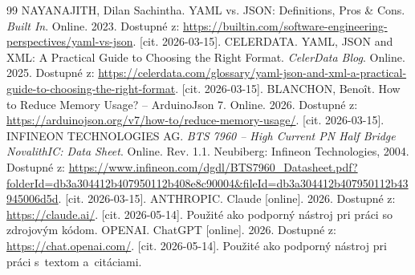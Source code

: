 \begin{thebibliography}{99}
    NAYANAJITH, Dilan Sachintha.
    YAML vs. JSON: Definitions, Pros \& Cons.
    \textit{Built In}. Online. 2023.
    Dostupné z: \url{https://builtin.com/software-engineering-perspectives/yaml-vs-json}. [cit. 2026-03-15].
    CELERDATA.
    YAML, JSON and XML: A Practical Guide to Choosing
    the Right Format.
    \textit{CelerData Blog}. Online. 2025.
    Dostupné z: \url{https://celerdata.com/glossary/yaml-json-and-xml-a-practical-guide-to-choosing-the-right-format}. [cit. 2026-03-15].
    BLANCHON, Benoît.
    How to Reduce Memory Usage? -- ArduinoJson 7. Online.
    2026.
    Dostupné z: \url{https://arduinojson.org/v7/how-to/reduce-memory-usage/}. [cit. 2026-03-15].
    INFINEON TECHNOLOGIES AG.
    \textit{BTS 7960 -- High Current PN Half Bridge NovalithIC:
    Data Sheet}. Online.
    Rev. 1.1. Neubiberg: Infineon Technologies, 2004.
    Dostupné z: \url{https://www.infineon.com/dgdl/BTS7960_Datasheet.pdf?folderId=db3a304412b407950112b408e8c90004&fileId=db3a304412b407950112b43945006d5d}. [cit. 2026-03-15].
    ANTHROPIC.
    Claude [online]. 2026.
    Dostupné z: \url{https://claude.ai/}. [cit. 2026-05-14].
    Použité ako podporný nástroj pri práci so zdrojovým kódom.
    OPENAI.
    ChatGPT [online]. 2026.
    Dostupné z: \url{https://chat.openai.com/}. [cit. 2026-05-14].
    Použité ako podporný nástroj pri práci s~textom a~citáciami.

\end{thebibliography}
